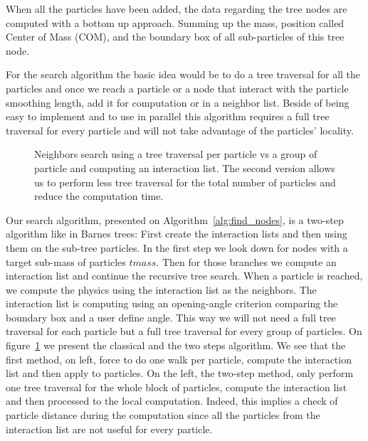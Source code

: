 When all the particles have been added, the data regarding the tree nodes are computed with a bottom up approach. 
Summing up the mass, position called Center of Mass (COM), and the boundary box of all sub-particles of this tree node.

For the search algorithm the basic idea would be to do a tree traversal for all the particles and once we reach a particle or a node that interact with the particle smoothing length, add it for computation or in a neighbor list. 
Beside of being easy to implement and to use in parallel this algorithm requires a full tree traversal for every particle and will not take advantage of the particles' locality.

\begin{figure}[ht!]
\centering

\caption[Neighbor search in the tree data structure]{Neighbors search using a tree traversal per particle vs a group of particle and computing an interaction list. The second version allows us to perform less tree traversal for the total number of particles and reduce the computation time.}
\label{fig:arbre}
\end{figure}

Our search algorithm, presented on Algorithm~\ref{alg:find_nodes}, is a two-step algorithm like in Barnes trees: First create the interaction lists and then using them on the sub-tree particles. 
In the first step we look down for nodes with a target sub-mass of particles $tmass$. 
Then for those branches we compute an interaction list and continue the recursive tree search. 
When a particle is reached, we compute the physics using the interaction list as the neighbors. 
The interaction list is computing using an opening-angle criterion comparing the boundary box and a user define angle. 
This way we will not need a full tree traversal for each particle but a full tree traversal for every group of particles.
On figure~\ref{fig:arbre} we present the classical and the two steps algorithm. 
We see that the first method, on left, force to do one walk per particle, compute the interaction list and then apply to particles. 
On the left, the two-step method, only perform one tree traversal for the whole block of particles, compute the interaction list and then processed to the local computation. 
Indeed, this implies a check of particle distance during the computation since all the particles from the interaction list are not useful for every particle. 


